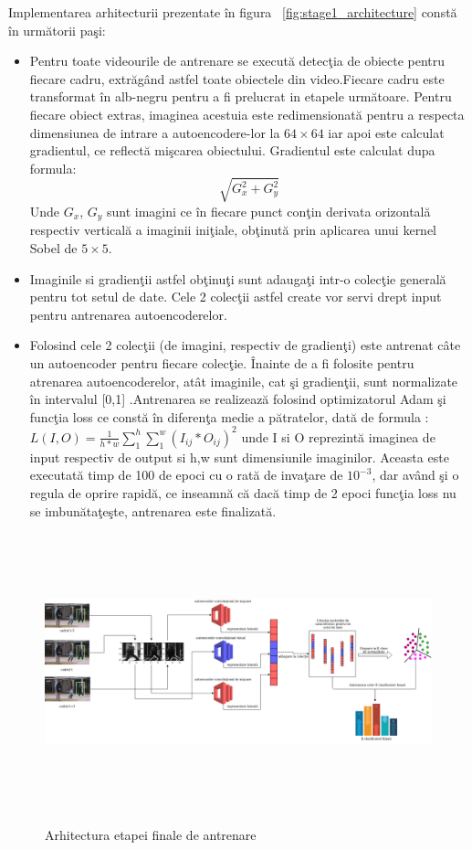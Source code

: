 \documentclass[a4paper,12pt]{report}
\begin{document}
\par
Implementarea arhitecturii prezentate în figura ~\ref{fig:stage1_architecture} constă în următorii paşi:
\begin {itemize}
\item Pentru toate videourile de antrenare se execută detecţia de obiecte pentru fiecare cadru, extrăgând astfel toate obiectele din video.Fiecare cadru este transformat în alb-negru pentru a fi prelucrat in etapele următoare. Pentru fiecare obiect extras, imaginea acestuia este redimensionată pentru a respecta dimensiunea de intrare a autoencodere-lor la \( 64 \times 64 \) iar apoi este calculat gradientul, ce reflectă mişcarea obiectului. Gradientul este calculat dupa formula: \[\sqrt{G_{x}^2 + G_{y}^2}\] Unde \(G_{x}\), \(G_{y}\) sunt imagini ce în fiecare punct conţin derivata orizontală respectiv verticală a imaginii iniţiale, obţinută prin aplicarea unui kernel Sobel de \(5 \times 5 \).
\item Imaginile si gradienţii astfel obţinuţi sunt adaugaţi intr-o colecţie generală pentru tot setul de date. Cele 2 colecţii astfel create vor servi drept input pentru antrenarea autoencoderelor.
\item Folosind cele 2 colecţii (de imagini, respectiv de gradienţi) este antrenat câte un autoencoder pentru fiecare colecţie. Înainte de a fi folosite pentru atrenarea autoencoderelor, atât imaginile, cat şi gradienţii, sunt normalizate în intervalul [0,1] .Antrenarea se realizează folosind optimizatorul Adam \cite{adam2017} şi funcţia loss ce constă în diferenţa medie a pătratelor, dată de formula : 
\(L(I,O) = \frac{1} {h*w} \sum_{1}^{h} \sum_{1}^{w} (I_{ij} * O_{ij})^2 \)   \cite{ionescu2019object} unde I si O reprezintă imaginea de input respectiv de output si h,w sunt dimensiunile imaginilor. Aceasta este executată timp de 100 de epoci cu o rată de invaţare de \(10^{-3}\), dar având şi o regula de oprire rapidă, ce inseamnă că dacă timp de 2 epoci funcţia loss nu se imbunătaţeşte, antrenarea este finalizată.
\end{itemize}

\begin{figure}[h]
\begin{center}
        \includegraphics[width=1\textwidth,height=8cm]{images/training_stage2_architecture}
			 \label{fig:stage2_architecture}
			 \caption{Arhitectura etapei finale de antrenare}
\end{center}
\end{figure}
\end{document}
